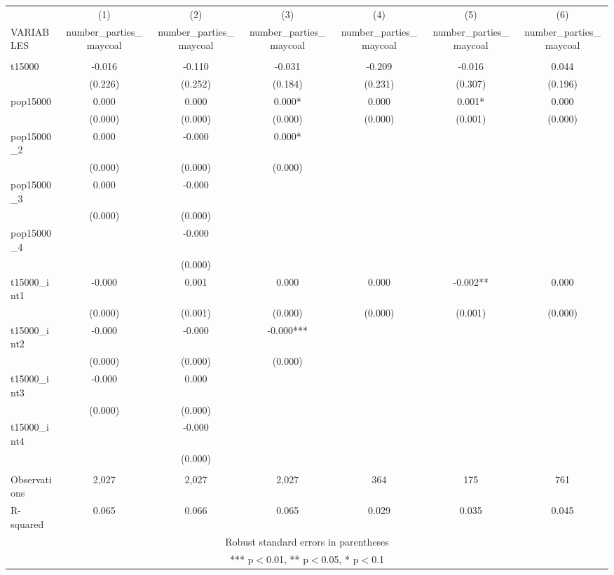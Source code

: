 \documentclass[]{article}
\begin{document}
\begin{tabular}{lcccccc} \hline
 & (1) & (2) & (3) & (4) & (5) & (6) \\
VARIABLES & number\_parties\_maycoal & number\_parties\_maycoal & number\_parties\_maycoal & number\_parties\_maycoal & number\_parties\_maycoal & number\_parties\_maycoal \\ \hline
 &  &  &  &  &  &  \\
t15000 & -0.016 & -0.110 & -0.031 & -0.209 & -0.016 & 0.044 \\
 & (0.226) & (0.252) & (0.184) & (0.231) & (0.307) & (0.196) \\
pop15000 & 0.000 & 0.000 & 0.000* & 0.000 & 0.001* & 0.000 \\
 & (0.000) & (0.000) & (0.000) & (0.000) & (0.001) & (0.000) \\
pop15000\_2 & 0.000 & -0.000 & 0.000* &  &  &  \\
 & (0.000) & (0.000) & (0.000) &  &  &  \\
pop15000\_3 & 0.000 & -0.000 &  &  &  &  \\
 & (0.000) & (0.000) &  &  &  &  \\
pop15000\_4 &  & -0.000 &  &  &  &  \\
 &  & (0.000) &  &  &  &  \\
t15000\_int1 & -0.000 & 0.001 & 0.000 & 0.000 & -0.002** & 0.000 \\
 & (0.000) & (0.001) & (0.000) & (0.000) & (0.001) & (0.000) \\
t15000\_int2 & -0.000 & -0.000 & -0.000*** &  &  &  \\
 & (0.000) & (0.000) & (0.000) &  &  &  \\
t15000\_int3 & -0.000 & 0.000 &  &  &  &  \\
 & (0.000) & (0.000) &  &  &  &  \\
t15000\_int4 &  & -0.000 &  &  &  &  \\
 &  & (0.000) &  &  &  &  \\
 &  &  &  &  &  &  \\
Observations & 2,027 & 2,027 & 2,027 & 364 & 175 & 761 \\
 R-squared & 0.065 & 0.066 & 0.065 & 0.029 & 0.035 & 0.045 \\ \hline
\multicolumn{7}{c}{ Robust standard errors in parentheses} \\
\multicolumn{7}{c}{ *** p$<$0.01, ** p$<$0.05, * p$<$0.1} \\
\end{tabular}
\end{document}
